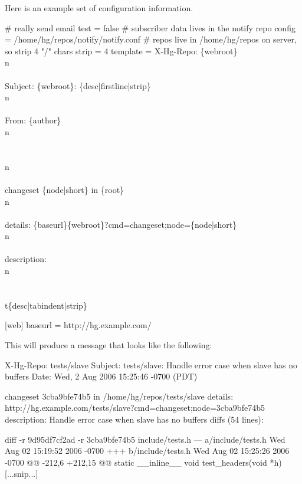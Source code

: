 Here is an example set of  configuration information.
\begin{codesample2}
  [notify]
  # really send email
  test = false
  # subscriber data lives in the notify repo
  config = /home/hg/repos/notify/notify.conf
  # repos live in /home/hg/repos on server, so strip 4 "/" chars
  strip = 4
  template = X-Hg-Repo: \{webroot\}\\n\\\\
    Subject: \{webroot\}: \{desc|firstline|strip\}\\n\\\\
    From: \{author\}\\n\\\\
    \\n\\\\
    changeset \{node|short\} in \{root\}\\n\\\\
    details: \{baseurl\}\{webroot\}?cmd=changeset;node=\{node|short\}\\n\\\\
    description:\\n\\\\
    \\t\{desc|tabindent|strip\}

  [web]
  baseurl = http://hg.example.com/
\end{codesample2}

This will produce a message that looks like the following:
\begin{codesample2}
  X-Hg-Repo: tests/slave
  Subject: tests/slave: Handle error case when slave has no buffers
  Date: Wed,  2 Aug 2006 15:25:46 -0700 (PDT)

  changeset 3cba9bfe74b5 in /home/hg/repos/tests/slave
  details: http://hg.example.com/tests/slave?cmd=changeset;node=3cba9bfe74b5
  description:
          Handle error case when slave has no buffers
  diffs (54 lines):

  diff -r 9d95df7cf2ad -r 3cba9bfe74b5 include/tests.h
  --- a/include/tests.h      Wed Aug 02 15:19:52 2006 -0700
  +++ b/include/tests.h      Wed Aug 02 15:25:26 2006 -0700
  @@ -212,6 +212,15 @@ static __inline__ void test_headers(void *h)
  [...snip...]
\end{codesample2}

